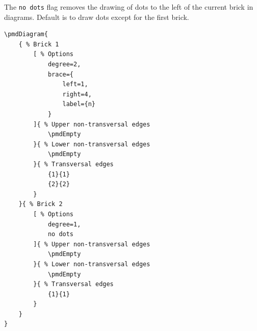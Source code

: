 \documentclass{ltxdoc}
\begin{document}
The \texttt{no dots} flag removes the drawing of dots to the left of the current brick in diagrams. Default is to draw dots except for the first brick.
\begin{center}
    \begin{minipage}{\dimexpr0.85\textwidth-2\fboxrule-2\fboxsep\relax}
        \begin{minipage}[c]{0.4\linewidth}
\begin{verbatim}
\pmdDiagram{
    { % Brick 1
        [ % Options
            degree=2,
            brace={
                left=1,
                right=4,
                label={n}
            }
        ]{ % Upper non-transversal edges
            \pmdEmpty
        }{ % Lower non-transversal edges
            \pmdEmpty
        }{ % Transversal edges
            {1}{1}
            {2}{2}
        }
    }{ % Brick 2
        [ % Options
            degree=1,
            no dots
        ]{ % Upper non-transversal edges
            \pmdEmpty
        }{ % Lower non-transversal edges
            \pmdEmpty
        }{ % Transversal edges
            {1}{1}
        }
    }
}
\end{verbatim}
        \end{minipage}
        \hfill
        \begin{minipage}[c]{0.4\linewidth}
        \end{minipage}
    \end{minipage}%
\end{center}
\begin{center}
\end{center}
\end{document}
